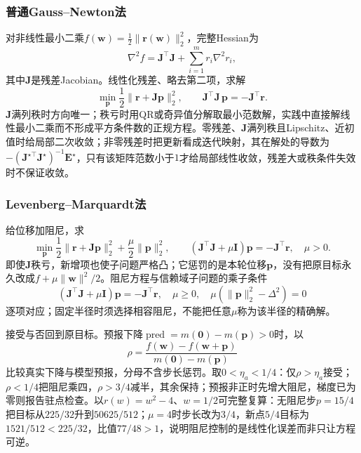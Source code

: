 \subsubsection{普通Gauss--Newton法}

对非线性最小二乘$f(\bm w)=\frac12\|\bm r(\bm w)\|_2^2$，完整Hessian为
\[
 \nabla^2f=\bm J^\top\bm J+\sum_{i=1}^m r_i\nabla^2r_i,
\]
其中$\bm J$是残差Jacobian。线性化残差、略去第二项，求解
\[
 \min_{\bm p}\frac12\|\bm r+\bm J\bm p\|_2^2,
 \qquad
 \bm J^\top\bm J\,\bm p=-\bm J^\top\bm r.
\]
$\bm J$满列秩时方向唯一；秩亏时用QR或奇异值分解取最小范数解，实践中直接解线性最小二乘而不形成平方条件数的正规方程。零残差、$\bm J$满列秩且Lipschitz、近初值时给局部二次收敛；非零残差时把更新看成迭代映射，其在解处的导数为$-(\bm J^{\star\top}\bm J^\star)^{-1}\bm E^\star$，只有该矩阵范数小于$1$才给局部线性收敛，残差大或秩条件失效时不保证收敛。

\subsubsection{Levenberg--Marquardt法}

给位移加阻尼，求
\begin{equation}
 \min_{\bm p}\frac12\|\bm r+\bm J\bm p\|_2^2+\frac{\mu}{2}\|\bm p\|_2^2,
 \qquad
 (\bm J^\top\bm J+\mu\bm I)\bm p=-\bm J^\top\bm r,
 \quad\mu>0.
 \label{eq:opt-lm-equation}
\end{equation}
\label{sec:opt-levenberg-marquardt}
即使$\bm J$秩亏，新增项也使子问题严格凸；它惩罚的是本轮位移$\bm p$，没有把原目标永久改成$f+\mu\|\bm w\|^2/2$。阻尼方程与信赖域子问题的乘子条件
\[
 (\bm J^\top\bm J+\mu\bm I)\bm p=-\bm J^\top\bm r,\quad
 \mu\geq0,\quad
 \mu(\|\bm p\|_2^2-\Delta^2)=0
\]
逐项对应；固定半径时须选择相容阻尼，不能把任意$\mu$称为该半径的精确解。

接受与否回到原目标。预报下降$\operatorname{pred}=m(\bm0)-m(\bm p)>0$时，以
\begin{equation}
 \rho=\frac{f(\bm w)-f(\bm w+\bm p)}{m(\bm0)-m(\bm p)}
 \label{eq:opt-lm-reduction-ratio}
\end{equation}
比较真实下降与模型预报，分母不含步长惩罚。取$0<\eta_a<1/4$：仅$\rho>\eta_a$接受；$\rho<1/4$把阻尼乘四，$\rho>3/4$减半，其余保持；预报非正时先增大阻尼，梯度已为零则报告驻点检查。以$r(w)=w^2-4$、$w=1/2$可完整复算：无阻尼步$p=15/4$把目标从$225/32$升到$50625/512$；$\mu=4$时步长改为$3/4$，新点$5/4$目标为$1521/512<225/32$，比值$77/48>1$，说明阻尼控制的是线性化误差而非只让方程可逆。

